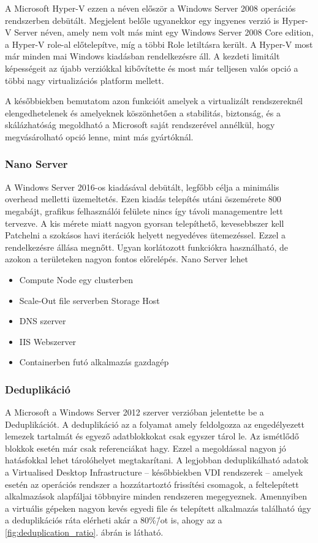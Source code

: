 \documentclass[12pt,oneside,justify]{book}
\begin{document}
A Microsoft Hyper-V ezzen a néven először a Windows Server 2008 operációs rendszerben debütált. 
Megjelent belőle ugyanekkor egy ingyenes verzió is Hyper-V Server néven, amely nem volt más mint egy Windows Server 2008 Core edition, a Hyper-V role-al előtelepítve, míg a többi Role letiltásra került.
A Hyper-V most már minden mai Windows kiadásban rendelkezésre áll. A kezdeti limitált képességeit az újabb verziókkal kibővítette és most már telljesen valós opció a többi nagy virtualizációs platform mellett. 

A későbbiekben bemutatom azon funkcióit amelyek a virtualizált rendszereknél elengedhetelenek és amelyeknek köszönhetően a stabilitás, biztonság, és a skálázhatóság megoldható a Microsoft saját rendszerével annélkül, hogy megvásárolható opció lenne, mint más gyártóknál.

\subsubsection{Nano Server}

A Windows Server 2016-os kiadásával debütált, legfőbb célja a minimális overhead melletti üzemeltetés. 
Ezen kiadás telepítés utáni öszemérete 800 megabájt, grafikus felhasználói felülete nincs így távoli managementre lett tervezve.
A kis mérete miatt nagyon gyorsan telepíthető, kevesebbszer kell Patchelni a szokásos havi iterációk helyett negyedéves ütemezéssel. 
Ezzel a rendelkezésre állása megnőtt. 
Ugyan korlátozott funkciókra használható, de azokon a területeken nagyon fontos előrelépés. 
Nano Server lehet 
\begin{itemize}
	\item Compute Node egy clusterben
	\item Scale-Out file serverben Storage Host
	\item DNS szerver
	\item IIS Webszerver
	\item Containerben futó alkalmazás gazdagép
\end{itemize}

\subsubsection{Deduplikáció}

A Microsoft a Windows Server 2012 szerver verzióban jelentette be a Deduplikációt. 
A deduplikáció az a folyamat amely feldolgozza az engedélyezett lemezek tartalmát és egyező adatblokkokat csak egyszer tárol le. Az ismétlődő blokkok esetén már csak referenciákat hagy. 
Ezzel a megoldással nagyon jó hatásfokkal lehet tárolóhelyet megtakarítani. 
A legjobban deduplikálható adatok a Virtualised Desktop Infrastructure -- későbbiekben VDI rendszerek -- amelyek esetén az operációs rendszer a hozzátartoztó frissítési csomagok, a feltelepített alkalmazások alapfáljai többnyire minden rendszeren megegyeznek. 
Amennyiben a virtuális gépeken nagyon kevés egyedi file és telepített alkalmazás található úgy a deduplikációs ráta elérheti akár a 80\%\=/ot is, ahogy az a \ref{fig:deduplication_ratio}. ábrán is látható.
\end{document}
